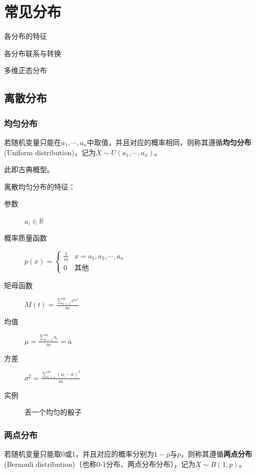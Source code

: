 \chapter{常见分布}
\begin{introduction}[考试重点]
    \item 各分布的特征
    \item 各分布联系与转换
    \item 多维正态分布
\end{introduction}
\section{离散分布}

\subsection{均匀分布}

\begin{definition}[离散均匀分布]
    若随机变量只能在$a_1,\cdots ,a_n$中取值，并且对应的概率相同，则称其遵循\textbf{均匀分布}(Uniform distribution)，记为$X \sim U(a_1,\cdots ,a_n)$。
\end{definition}
\begin{remark}
    此即古典概型。
\end{remark}

离散均匀分布的特征：
\begin{description}
    \item[参数] $a_i \in \mathbb{R}$
    \item[概率质量函数] $p(x)=\begin{cases}
                \frac{1}{m} & x=a_1,a_2,\cdots ,a_n \\
                0           & \text{其他}
            \end{cases}$
    \item[矩母函数] $M(t)=\frac{\sum_{i=1}^m e^{a_i t}}{m}$
    \item[均值] $\mu=\frac{\sum_{i=1}^m a_i }{m}=\overline{a}$
    \item[方差] $\sigma^2=\frac{\sum_{i=1}^m (a_i-\overline{a})^2 }{m}$
    \item[实例] 丢一个均匀的骰子
\end{description}

\subsection{两点分布}

\begin{definition}[两点分布]
    若随机变量只能取0或1，并且对应的概率分别为$1-p$与$p$，则称其遵循\textbf{两点分布}(Bernouli distribution)（也称0-1分布、两点分布分布），记为$X \sim B(1,p)$。
\end{definition}

